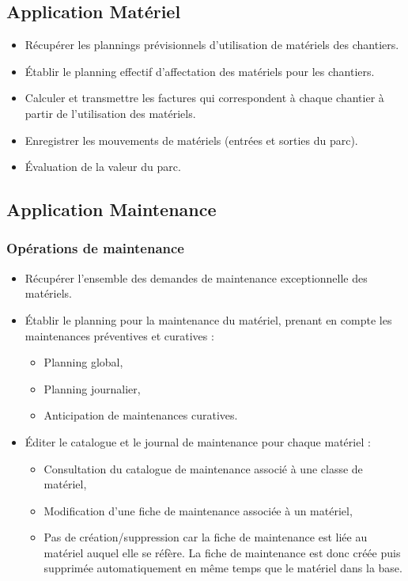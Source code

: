 \subsection{Application Matériel}
\begin{itemize}
\item Récupérer les plannings prévisionnels d'utilisation de matériels
des chantiers.
\item Établir le planning effectif d'affectation des
matériels pour les chantiers.
\item Calculer et transmettre les factures qui correspondent à chaque chantier
à partir de l'utilisation des matériels.
\item Enregistrer les mouvements de matériels (entrées et sorties du parc).
\item Évaluation de la valeur du parc.
\end{itemize}


\subsection{Application Maintenance}
\subsubsection{Opérations de maintenance}
\begin{itemize}
\item Récupérer l'ensemble des demandes de maintenance exceptionnelle
des matériels.
\item Établir le planning pour la maintenance du matériel, prenant en
compte les maintenances préventives et curatives :
    \begin{itemize}
    \item Planning global,
    \item Planning journalier,
    \item Anticipation de maintenances curatives.
    \end{itemize}
\item Éditer le catalogue et le  journal de maintenance pour chaque matériel :
    \begin{itemize}
    \item Consultation du catalogue de maintenance associé à une classe de 
    matériel,
    \item Modification d'une fiche de maintenance associée à un matériel,
    \item Pas de création/suppression car la fiche de maintenance est liée
    au matériel auquel elle se réfère. La fiche de maintenance est donc
    créée puis supprimée automatiquement en même temps que le matériel dans
    la base.
    \end{itemize}
\end{itemize}


